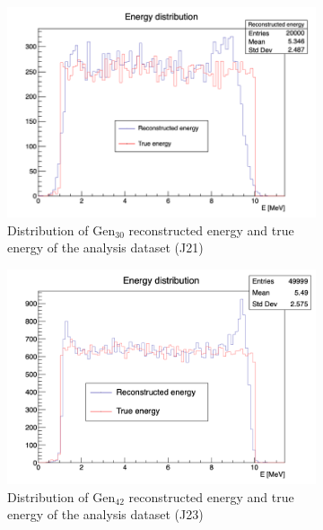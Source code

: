 \documentclass[../main.tex]{subfiles}
\begin{document}
{{\begin{figure}[ht]
  \centering
  \begin{subfigure}[t]{0.48\linewidth}
    \includegraphics[width=\linewidth]{images/jcnn/vic_cnn/e_dis.png}
    \caption{Distribution of $\mathrm{Gen}_{30}$ reconstructed energy and true energy of the analysis dataset (J21)}
    \label{fig:jcnn:edis}
  \end{subfigure}
  \hfill
  \begin{subfigure}[t]{0.48\linewidth}
    \includegraphics[width=\linewidth]{images/jcnn/vic_cnn/e_dis_42.png}
    \caption{Distribution of $\mathrm{Gen}_{42}$ reconstructed energy and true energy of the analysis dataset (J23)}
    \label{fig:jcnn:edis42}
  \end{subfigure}
  \caption{}
\end{figure}

}}
\end{document}
